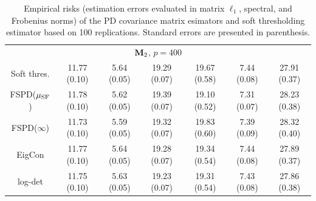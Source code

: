 \documentclass[times,sort&compress,3p]{elsarticle}
\begin{document}
\begin{table}[htb!]
{\begin{center}
\begin{tabular}{c|ccc|ccc}

\multicolumn{7}{c}{${\bf M}_2$, $p = 400$} \\
Soft thres. & 11.77 (0.10)  & 5.64 (0.05)  & 19.29 (0.07) & 19.67 (0.58)  & 7.44 (0.08)  & 27.91 (0.37) \\
 FSPD($\mu_{\rm SF}$) & 11.78 (0.10)  & 5.62 (0.05)  & 19.39 (0.07) & 19.10 (0.52)  & 7.31 (0.07)  & 28.23 (0.38) \\
 FSPD($\infty$) & 11.73 (0.10)  & 5.59 (0.05)  & 19.32 (0.07) & 19.83 (0.60)  & 7.39 (0.09)  & 28.32 (0.40) \\
 EigCon & 11.77 (0.10)  & 5.64 (0.05)  & 19.28 (0.07) & 19.34 (0.54)  & 7.44 (0.08)  & 27.89 (0.37) \\
 log-det  & 11.75 (0.10)  & 5.63 (0.05)  & 19.23 (0.07) & 19.31 (0.54)  & 7.43 (0.08)  & 27.86 (0.38) \\
\hline
\end{tabular}
\caption{ Empirical risks (estimation errors evaluated in matrix $\ell_1$, spectral, and Frobenius norms) of the PD covariance matrix esimators and soft thresholding estimator based on 100 replications. Standard errors are presented in parenthesis.}
\label{table:emperrcomp}
\end{center}
}
\end{table}
\end{document}
